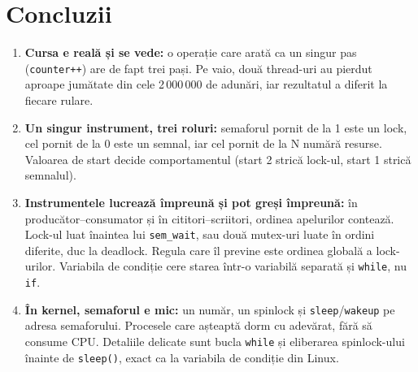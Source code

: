 \documentclass[12pt,a4paper]{article}
\begin{document}
\newpage
\section{Concluzii}
\begin{enumerate}
    \item \textbf{Cursa e reală și se vede:} o operație care arată ca un singur pas (\texttt{counter++}) are de fapt trei pași. Pe vaio, două thread-uri au pierdut aproape jumătate din cele 2\,000\,000 de adunări, iar rezultatul a diferit la fiecare rulare.
    \item \textbf{Un singur instrument, trei roluri:} semaforul pornit de la 1 este un lock, cel pornit de la 0 este un semnal, iar cel pornit de la N numără resurse. Valoarea de start decide comportamentul (start 2 strică lock-ul, start 1 strică semnalul).
    \item \textbf{Instrumentele lucrează împreună și pot greși împreună:} în producător--consumator și în cititori--scriitori, ordinea apelurilor contează. Lock-ul luat înaintea lui \texttt{sem\_wait}, sau două mutex-uri luate în ordini diferite, duc la deadlock. Regula care îl previne este ordinea globală a lock-urilor. Variabila de condiție cere starea într-o variabilă separată și \texttt{while}, nu \texttt{if}.
    \item \textbf{În kernel, semaforul e mic:} un număr, un spinlock și \texttt{sleep}/\texttt{wakeup} pe adresa semaforului. Procesele care așteaptă dorm cu adevărat, fără să consume CPU. Detaliile delicate sunt bucla \texttt{while} și eliberarea spinlock-ului înainte de \texttt{sleep()}, exact ca la variabila de condiție din Linux.
\end{enumerate}
\end{document}
